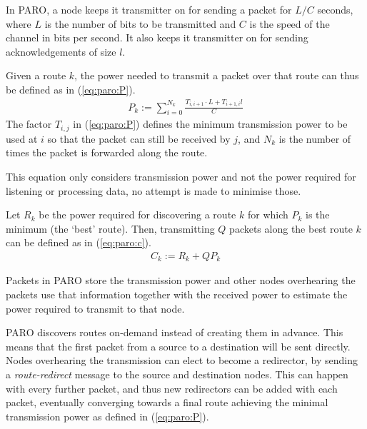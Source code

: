 In PARO, a node keeps it transmitter on for sending a packet for $L/C$ seconds,
where $L$ is the number of bits to be transmitted and $C$ is the speed of the
channel in bits per second.
It also keeps it transmitter on for sending acknowledgements of size $l$.

Given a route $k$, the power needed to transmit a packet over that
route can thus be defined as in (\ref{eq:paro:P}).
\begin{align}\label{eq:paro:P}
  P_{k} := \sum_{i=0}^{N_{k}} \frac{T_{i,i+1} \cdot L + T_{i+1,i} l}{C}
\end{align}
The factor $T_{i,j}$ in (\ref{eq:paro:P}) defines the minimum transmission power
to be used at $i$ so that the packet can still be received by $j$, and $N_{k}$
is the number of times the packet is forwarded along the route.

This equation only considers transmission power and not the power required for
listening or processing data, no attempt is made to minimise those.

Let $R_{k}$ be the power required for discovering a route $k$ for which $P_{k}$
is the minimum (the `best' route). Then, transmitting $Q$ packets along the best route $k$ can be
defined as in (\ref{eq:paro:c}).
\begin{align}\label{eq:paro:c}
  C_{k} := R_{k} + Q P_{k}
\end{align}


Packets in PARO store the transmission power and other nodes overhearing the
packets use that information together with the received power to estimate the
power required to transmit to that node.

PARO discovers routes on-demand instead of creating them in advance. This means
that the first packet from a source to a destination will be sent directly. Nodes
overhearing the transmission can elect to become a redirector, by sending a
\textit{route-redirect} message to the source and destination nodes. This can
happen with every further packet, and thus new redirectors can be added with
each packet, eventually converging towards a final route achieving the minimal
transmission power as defined in (\ref{eq:paro:P}).
